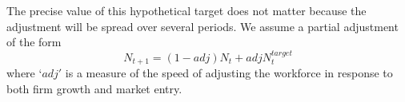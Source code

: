 The precise value of this hypothetical target does not matter because the adjustment will be spread over several periods. We assume a partial adjustment of the form
\begin{equation}
N_{t+1}= (1-adj)N_t + adj N_t^{target}
\end{equation} 
where `$adj'$ is a measure of the speed of adjusting the workforce in response to both firm growth and market entry. %

























